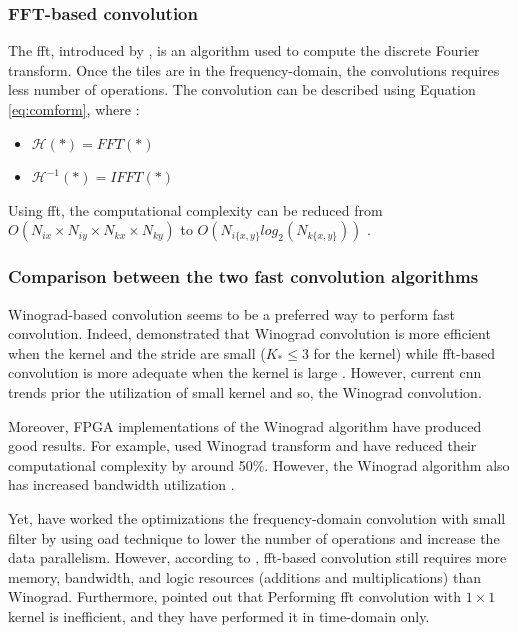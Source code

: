 \subsubsection{FFT-based convolution}
%
The \acrshort{fft}, introduced by \textcite{cooley_algorithm_1965}, is an algorithm used to compute the discrete Fourier transform. Once the tiles are in the frequency-domain, the convolutions requires less number of operations. The convolution can be described using Equation \eqref{eq:comform}, where \cite{liang_evaluating_2020}:
\begin{itemize}
    \item $\mathcal{H}(*) = FFT(*)$
    \item $\mathcal{H}^{-1}(*) = IFFT(*)$
\end{itemize}
%
Using \acrshort{fft}, the computational complexity can be reduced from $O(N_{ix} \times N_{iy} \times N_{kx} \times N_{ky})$ to $O(N_{i\{x,y\}} log_2(N_{k\{x,y\}}))$ \cite{w_smith_scientist_1997}.
%
\subsubsection{Comparison between the two fast convolution algorithms}
%
Winograd-based convolution seems to be a preferred way to perform fast convolution. Indeed, \textcite{lavin_fast_2015} demonstrated that Winograd convolution is more efficient when the kernel and the stride are small ($K_* \leq 3$ for the kernel) while \acrshort{fft}-based convolution is more adequate when the kernel is large \cite{ahmad_towards_2019, chitsaz_acceleration_2020}. However, current \acrshort{cnn} trends prior the utilization of small kernel \cite{liang_evaluating_2020, sandler_mobilenetv2_2019} and so, the Winograd convolution.

Moreover, FPGA implementations of the Winograd algorithm have produced good results. For example, \cite{aydonat_opencl_2017, liang_evaluating_2020} used Winograd transform and have reduced their computational complexity by around 50\%. However, the Winograd algorithm also has increased bandwidth utilization \cite{xiao_exploring_2017}.

Yet, \textcite{zeng_optimizing_2017, chitsaz_acceleration_2020, liang_evaluating_2020} have worked the optimizations the frequency-domain convolution with small filter by using \acrfull{oad} technique \cite{w_smith_scientist_1997} to lower the number of operations and increase the data parallelism. However, according to \textcite{liang_evaluating_2020, podili_fast_2017}, \acrshort{fft}-based convolution still requires more memory, bandwidth, and logic resources (additions and multiplications) than Winograd. Furthermore, \textcite{zhang_caffeine_2016} pointed out that Performing \acrshort{fft} convolution with $1 \times 1$ kernel is inefficient, and they have performed it in time-domain only.
